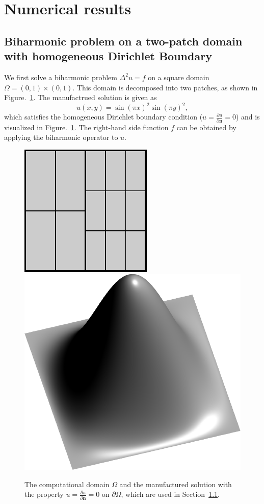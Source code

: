 \documentclass[preprint,12pt]{elsarticle}
\begin{document}
\section{Numerical results}
\subsection{Biharmonic problem on a two-patch domain with homogeneous Dirichlet Boundary} \label{sec:introduction}

We first solve a biharmonic problem $\Delta^2{}u=f$ on a square domain $\Omega={(0,1)\times(0,1)}$. This domain is decomposed into two patches, as shown in Figure.~\ref{fig:two_patch_biharmonic_problem}. The manufactrued solution is given as
\begin{equation}
    u(x,y)=\sin(\pi{x})^2\sin(\pi{y})^2,
\end{equation}
which satisfies the homogeneous Dirichlet boundary condition ($u=\frac{\partial{u}}{\partial{\mathbf{n}}}=0$) and is visualized in Figure.~\ref{fig:two_patch_biharmonic_problem}. The right-hand side function $f$ can be obtained by applying the biharmonic operator to $u$.
\begin{figure}[hbt]
	\centering
    \includegraphics[width=.47\linewidth]{two_patches_nonconform}
    \includegraphics[width=.47\linewidth]{two_patches_solution}
	\caption{The computational domain $\Omega$ and the manufactured solution with the property $u=\frac{\partial{u}}{\partial{\mathbf{n}}}=0$ on $\partial{\Omega}$, which are used in Section~\ref{sec:introduction}.}\label{fig:two_patch_biharmonic_problem}
\end{figure}
\end{document}
